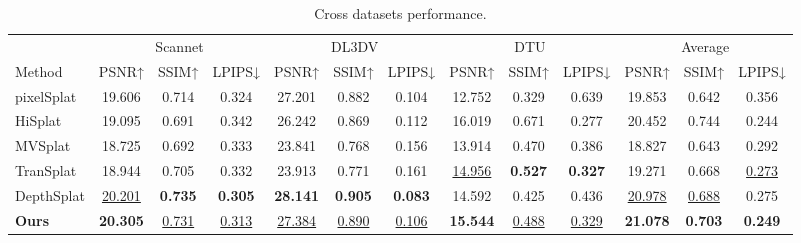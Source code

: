 \begin{table}[t]
\centering
\caption{Cross datasets performance.}
\vspace{-10pt}
\label{cross}
\fontsize{7}{11.5}\selectfont
\setlength{\tabcolsep}{4pt}
\begin{tabular}{lccc|ccc|ccc|ccc}
\toprule
& \multicolumn{3}{c|}{Scannet} & \multicolumn{3}{c|}{DL3DV} & \multicolumn{3}{c|}{DTU} & \multicolumn{3}{c}{Average} \\
Method & PSNR↑ & SSIM↑ & LPIPS↓ & PSNR↑ & SSIM↑ & LPIPS↓ & PSNR↑ & SSIM↑ & LPIPS↓ & PSNR↑ & SSIM↑ & LPIPS↓ \\
\midrule
pixelSplat  & 19.606 & 0.714 & 0.324 & 27.201 & 0.882 & 0.104 & 12.752 & 0.329 & 0.639 & 19.853 & 0.642 & 0.356 \\
HiSplat  & 19.095 & 0.691 & 0.342 & 26.242 & 0.869 & 0.112 & 16.019 & 0.671 & 0.277 & 20.452 & 0.744 & 0.244 \\
\midrule
MVSplat & 18.725 & 0.692 & 0.333 & 23.841 & 0.768 & 0.156 & 13.914 & 0.470 & 0.386 & 18.827 & 0.643 & 0.292 \\
TranSplat  & 18.944 & 0.705 & 0.332 & 23.913 & 0.771 & 0.161 & \underline{14.956} & \textbf{0.527} & \textbf{0.327} & 19.271 & 0.668 & \underline{0.273} \\
DepthSplat  & \underline{20.201} & \textbf{0.735} & \textbf{0.305} & \textbf{28.141} & \textbf{0.905} & \textbf{0.083} & 14.592 & 0.425 & 0.436 & \underline{20.978} & \underline{0.688} & 0.275 \\
\textbf{Ours} & \textbf{20.305} & \underline{0.731} & \underline{0.313} & \underline{27.384} & \underline{0.890} & \underline{0.106} & \textbf{15.544} & \underline{0.488} & \underline{0.329} & \textbf{21.078} & \textbf{0.703} & \textbf{0.249} \\
\bottomrule
\end{tabular}
\vspace{-10pt}
\end{table}

